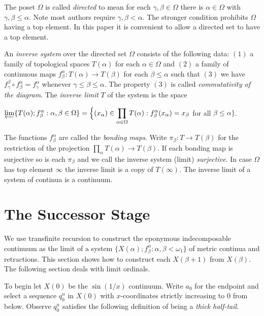 \documentclass[12pt]{article}
\theoremstyle{plain}
\theoremstyle{definition}
\newcommand{\A}{\ensuremath{\alpha}}
\newcommand{\B}{\ensuremath{\beta}}
\newcommand{\W}{\ensuremath{\omega}}
\newcommand{\WW}{\ensuremath{\Omega}}
\newcommand{\G}{\ensuremath{\gamma}}
\newcommand{\0}{\ensuremath{\varnothing}}
\begin{document}
	The poset $\WW$ is called \textit{directed} to mean for each $\G,\B \in \WW$ there is $\A \in \WW$ with $\G,\B \le \A$.
	Note most authors require $\G,\B < \A$. The stronger condition prohibits $\WW$ having a top element.
	In this paper it is convenient to allow a directed set to have a top element.
	
	An \textit{inverse system} over the directed set $\WW$ consists of the following data: $(1)$ a family of topological spaces $T(\A)$ for each $\A \in \WW$ and $(2)$ a family of continuous maps $f^\A_\B : T(\A) \to T(\B)$ for each $\B \le \A$ such that $(3)$ we have $f^\B_\G \circ f^\A_\B = f^\A_\G$ whenever $\G\le \B \le \A$. The property $(3)$ is called  \textit{commutativity of the diagram}.
	The \textit{inverse limit} $T$ of the system is the space 
	
	\begin{center}                                             
		$\displaystyle \varprojlim \{T(\A); f^\A_\B: \A,\B \in \WW\} = \Big \{(x_\A) \in \prod_{\A \in \WW} T(\A) : f^\A_\B(x_\A) = x_\B$ for all $ \B \le \A \Big \}$.
	\end{center}
	
	The functions $f^\A_\B$ are called the \textit{bonding maps}.
	Write $\pi_\B : T \to T(\B)$ for the restriction of the projection $\prod_\A T(\A) \to T(\B)$.
	If each bonding map is surjective so is each $\pi_\B$ and we call the inverse system (limit) \textit{surjective}.
	In case $\WW$ has top element $\infty$ the inverse limit is a copy of $T(\infty)$.
	The inverse limit of a system of continua is a continuum.
	
	
	
	\section{The Successor Stage}\label{5.3}
	
	
	We use transfinite recursion to construct the eponymous indecomposable continuum as the limit of a system \mbox{$\{X(\A); f^\A_\B : \A,\B< \W_1\}$} of metric continua and retractions. This section shows how to construct each $X(\B+1)$ from $X(\B)$. The following section deals with limit ordinals.
	
	To begin let $X(0)$ be the $\sin(1/x)$ continuum. Write $a_0$ for the endpoint and select a sequence $q^n_0$ in $X(0)$ with $x$-coordinates strictly increasing to $0$ from below.
	Observe $q^n_0$ satisfies the following definition of being a \textit{thick half-tail}.
	
\end{document}
